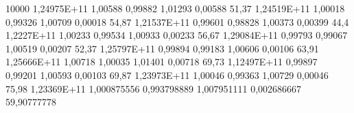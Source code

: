 10000	1,24975E+11	1,00588	0,99882	1,01293	0,00588	51,37																				
	1,24519E+11	1,00018	0,99326	1,00709	0,00018	54,87																				
	1,21537E+11	0,99601	0,98828	1,00373	0,00399	44,4																				
	1,2227E+11	1,00233	0,99534	1,00933	0,00233	56,67																				
	1,29084E+11	0,99793	0,99067	1,00519	0,00207	52,37																				
	1,25797E+11	0,99894	0,99183	1,00606	0,00106	63,91																				
	1,25666E+11	1,00718	1,00035	1,01401	0,00718	69,73																				
	1,12497E+11	0,99897	0,99201	1,00593	0,00103	69,87																				
	1,23973E+11	1,00046	0,99363	1,00729	0,00046	75,98																				
	1,23369E+11	1,000875556	0,993798889	1,007951111	0,002686667	59,90777778																				